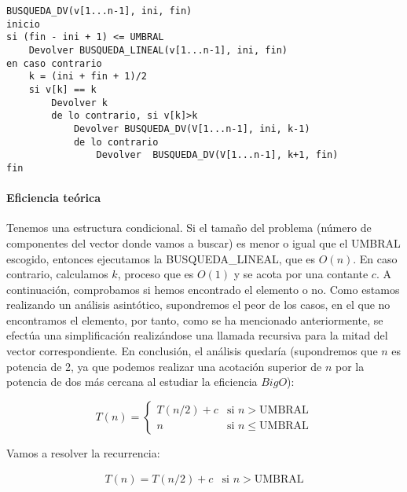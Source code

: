 \begin{lstlisting}
BUSQUEDA_DV(v[1...n-1], ini, fin)
inicio
si (fin - ini + 1) <= UMBRAL 
    Devolver BUSQUEDA_LINEAL(v[1...n-1], ini, fin)
en caso contrario
    k = (ini + fin + 1)/2
    si v[k] == k
        Devolver k
        de lo contrario, si v[k]>k
            Devolver BUSQUEDA_DV(V[1...n-1], ini, k-1)
            de lo contrario
                Devolver  BUSQUEDA_DV(V[1...n-1], k+1, fin)
fin
\end{lstlisting}

 

\paragraph{Eficiencia teórica}

Tenemos una estructura condicional. Si el tamaño del problema (número de componentes del vector donde 
vamos a buscar) es menor o igual que el UMBRAL escogido, entonces ejecutamos la BUSQUEDA_LINEAL, que es $O(n)$. 
En caso contrario, calculamos $k$, proceso que es $O(1)$ y se acota por una contante $c$. A continuación,
comprobamos si hemos encontrado el elemento o no. Como estamos realizando un análisis asintótico, supondremos
el peor de los casos, en el que no encontramos el elemento, por tanto, como se ha mencionado anteriormente,
se efectúa una simplificación realizándose una llamada recursiva para la mitad del vector correspondiente.
En conclusión, el análisis quedaría (supondremos que $n$ es potencia de 2, ya que podemos realizar una acotación 
superior de $n$ por la potencia de dos más cercana al estudiar la eficiencia $Big O$): 

\begin{equation}
    T(n) = \left\{ \begin{array}{lr} T(n/2) + c & \text{si } n > \text{UMBRAL}\\ n & \text{si } n \leqslant \text{UMBRAL} \end{array} \right.
\end{equation}

Vamos a resolver la recurrencia:

\begin{equation*}
    \begin{array}{lr}  T(n) =  T(n/2) + c & \text{si } n > \text{UMBRAL} \end{array}
\end{equation*}

